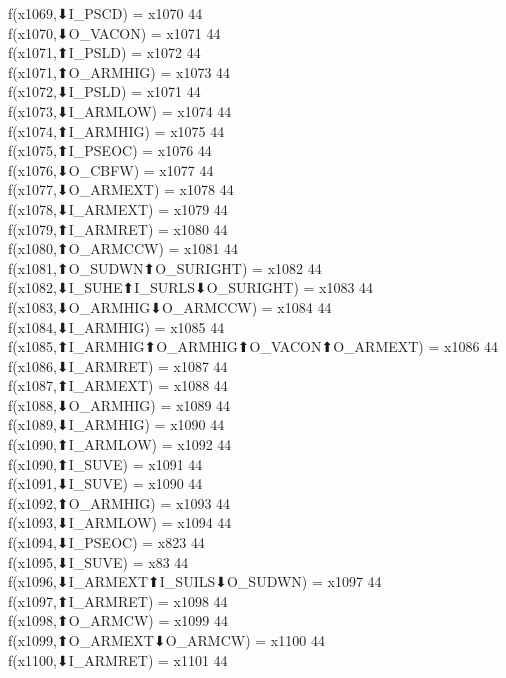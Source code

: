 f(x1069,⬇I_PSCD) = x1070 {44} \\
f(x1070,⬇O_VACON) = x1071 {44} \\
f(x1071,⬆I_PSLD) = x1072 {44} \\
f(x1071,⬆O_ARMHIG) = x1073 {44} \\
f(x1072,⬇I_PSLD) = x1071 {44} \\
f(x1073,⬇I_ARMLOW) = x1074 {44} \\
f(x1074,⬆I_ARMHIG) = x1075 {44} \\
f(x1075,⬆I_PSEOC) = x1076 {44} \\
f(x1076,⬇O_CBFW) = x1077 {44} \\
f(x1077,⬇O_ARMEXT) = x1078 {44} \\
f(x1078,⬇I_ARMEXT) = x1079 {44} \\
f(x1079,⬆I_ARMRET) = x1080 {44} \\
f(x1080,⬆O_ARMCCW) = x1081 {44} \\
f(x1081,⬆O_SUDWN⬆O_SURIGHT) = x1082 {44} \\
f(x1082,⬇I_SUHE⬆I_SURLS⬇O_SURIGHT) = x1083 {44} \\
f(x1083,⬇O_ARMHIG⬇O_ARMCCW) = x1084 {44} \\
f(x1084,⬇I_ARMHIG) = x1085 {44} \\
f(x1085,⬆I_ARMHIG⬆O_ARMHIG⬆O_VACON⬆O_ARMEXT) = x1086 {44} \\
f(x1086,⬇I_ARMRET) = x1087 {44} \\
f(x1087,⬆I_ARMEXT) = x1088 {44} \\
f(x1088,⬇O_ARMHIG) = x1089 {44} \\
f(x1089,⬇I_ARMHIG) = x1090 {44} \\
f(x1090,⬆I_ARMLOW) = x1092 {44} \\
f(x1090,⬆I_SUVE) = x1091 {44} \\
f(x1091,⬇I_SUVE) = x1090 {44} \\
f(x1092,⬆O_ARMHIG) = x1093 {44} \\
f(x1093,⬇I_ARMLOW) = x1094 {44} \\
f(x1094,⬇I_PSEOC) = x823 {44} \\
f(x1095,⬇I_SUVE) = x83 {44} \\
f(x1096,⬇I_ARMEXT⬆I_SUILS⬇O_SUDWN) = x1097 {44} \\
f(x1097,⬆I_ARMRET) = x1098 {44} \\
f(x1098,⬆O_ARMCW) = x1099 {44} \\
f(x1099,⬆O_ARMEXT⬇O_ARMCW) = x1100 {44} \\
f(x1100,⬇I_ARMRET) = x1101 {44} \\
